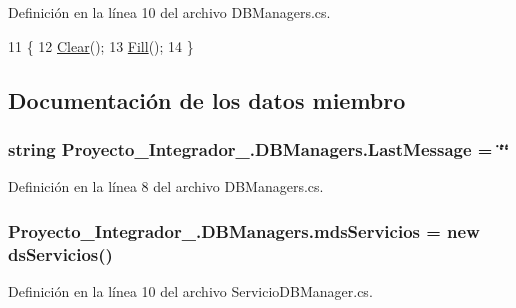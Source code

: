 Definición en la línea 10 del archivo D\-B\-Managers.\-cs.


\begin{DoxyCode}
11         \{
12             \hyperlink{class_proyecto___integrador__3_1_1_d_b_managers_a2af606713823aab2912dd18c719aeb48}{Clear}();
13             \hyperlink{class_proyecto___integrador__3_1_1_d_b_managers_a3766dfbef6eb8494cf1fd9e28a135bd7}{Fill}();
14         \}
\end{DoxyCode}


\subsection{Documentación de los datos miembro}
\hypertarget{class_proyecto___integrador__3_1_1_d_b_managers_aecf2d3981e87f16c1e3a60c7913931a8}{
\subsubsection[{Last\-Message}]{\setlength{\rightskip}{0pt plus 5cm}string Proyecto\-\_\-\-Integrador\-\_.\-D\-B\-Managers.\-Last\-Message = \char`\"{}\char`\"{}}}\label{class_proyecto___integrador__3_1_1_d_b_managers_aecf2d3981e87f16c1e3a60c7913931a8}


Definición en la línea 8 del archivo D\-B\-Managers.\-cs.

\hypertarget{class_proyecto___integrador__3_1_1_d_b_managers_a6b992d164f75898c6f9717fd5b839fa4}{
\subsubsection[{mds\-Servicios}]{ Proyecto\-\_\-\-Integrador\-\_.\-D\-B\-Managers.\-mds\-Servicios = new {\bf ds\-Servicios}()\hspace{0.3cm}{\ttfamily [protected]}}}\label{class_proyecto___integrador__3_1_1_d_b_managers_a6b992d164f75898c6f9717fd5b839fa4}


Definición en la línea 10 del archivo Servicio\-D\-B\-Manager.\-cs.

